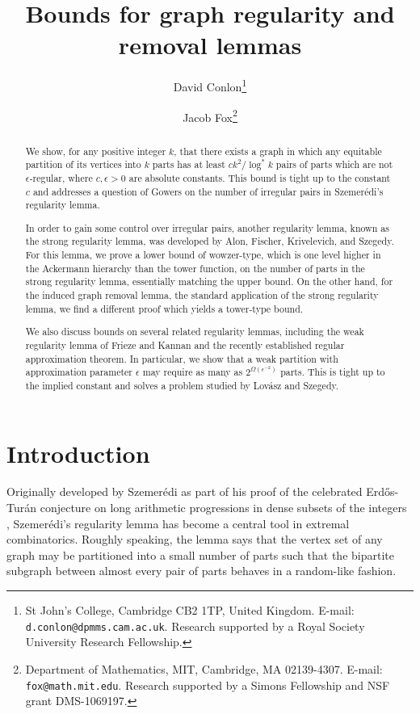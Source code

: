 \documentclass[11pt]{article}
\title{\vspace{-0.7cm} Bounds for graph regularity and removal lemmas}
\author{David Conlon\thanks{St John's College, Cambridge CB2 1TP, United
Kingdom.
E-mail: {\tt
d.conlon@dpmms.cam.ac.uk}. Research supported by a Royal Society University
Research Fellowship.} \and Jacob Fox\thanks{Department of Mathematics, MIT,
Cambridge, MA 02139-4307. E-mail: {\tt fox@math.mit.edu}. Research
supported by a Simons Fellowship and NSF grant DMS-1069197.}}
\date{}
\begin{document}
\maketitle

\begin{abstract}
We show, for any positive integer $k$, that there exists a graph in which any
equitable partition of its vertices into $k$ parts has at least $ck^2/\log^* k$
pairs of parts which are not $\epsilon$-regular, where $c,\epsilon>0$ are
absolute constants. This bound is tight up to the constant $c$ and addresses a
question of Gowers on the number of irregular pairs in Szemer\'edi's regularity
lemma.

In order to gain some control over irregular pairs, another regularity lemma,
known as the strong regularity lemma, was developed by Alon, Fischer,
Krivelevich, and Szegedy. For this lemma, we prove a lower bound of
wowzer-type, which is one level higher in the Ackermann hierarchy than the
tower function, on the number of parts in the strong regularity lemma,
essentially matching the upper bound. On the other hand, for the induced graph
removal lemma, the standard application of the strong regularity lemma, we find
a different proof which yields a tower-type bound.

We also discuss bounds on several related regularity lemmas, including the weak
regularity lemma of Frieze and Kannan and the recently established regular
approximation theorem. In particular, we show that a weak partition with
approximation parameter $\epsilon$ may require as many as
$2^{\Omega(\epsilon^{-2})}$ parts. This is tight up to the implied constant and
solves a problem studied by Lov\'asz and Szegedy.
\end{abstract}

\section{Introduction}

Originally developed by Szemer\'edi as part of his proof of the celebrated
Erd\H{o}s-Tur\'an conjecture on long arithmetic progressions in dense subsets
of the integers \cite{Sz1}, Szemer\'edi's regularity lemma \cite{Sz} has become a central tool in extremal combinatorics. Roughly speaking, the lemma says that the vertex
set of any graph may be partitioned into a small
number of parts such that the bipartite subgraph between almost every pair of
parts behaves in a random-like fashion.
\end{document}
